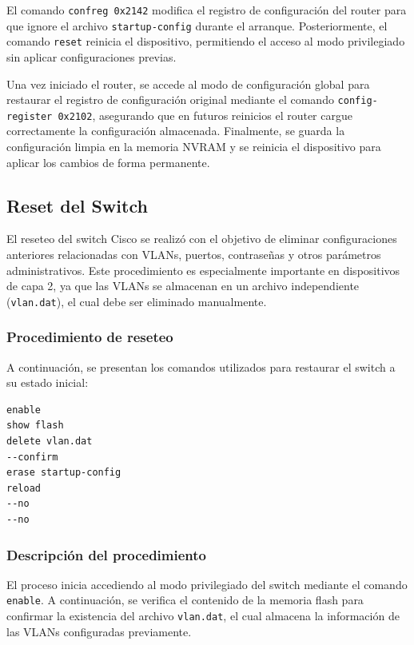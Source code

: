 El comando \texttt{confreg 0x2142} modifica el registro de configuración del router para que ignore el archivo \texttt{startup-config} durante el arranque. Posteriormente, el comando \texttt{reset} reinicia el dispositivo, permitiendo el acceso al modo privilegiado sin aplicar configuraciones previas.

Una vez iniciado el router, se accede al modo de configuración global para restaurar el registro de configuración original mediante el comando \texttt{config-register 0x2102}, asegurando que en futuros reinicios el router cargue correctamente la configuración almacenada. Finalmente, se guarda la configuración limpia en la memoria NVRAM y se reinicia el dispositivo para aplicar los cambios de forma permanente.

\subsection{Reset del Switch}

El reseteo del switch Cisco se realizó con el objetivo de eliminar configuraciones anteriores relacionadas con VLANs, puertos, contraseñas y otros parámetros administrativos. Este procedimiento es especialmente importante en dispositivos de capa 2, ya que las VLANs se almacenan en un archivo independiente (\texttt{vlan.dat}), el cual debe ser eliminado manualmente.

\subsubsection{Procedimiento de reseteo}

A continuación, se presentan los comandos utilizados para restaurar el switch a su estado inicial:

\begin{lstlisting}[caption={Comandos utilizados para el reset del Switch Cisco}]
enable
show flash
delete vlan.dat
--confirm
erase startup-config
reload
--no
--no
\end{lstlisting}

\subsubsection{Descripción del procedimiento}

El proceso inicia accediendo al modo privilegiado del switch mediante el comando \texttt{enable}. A continuación, se verifica el contenido de la memoria flash para confirmar la existencia del archivo \texttt{vlan.dat}, el cual almacena la información de las VLANs configuradas previamente.

